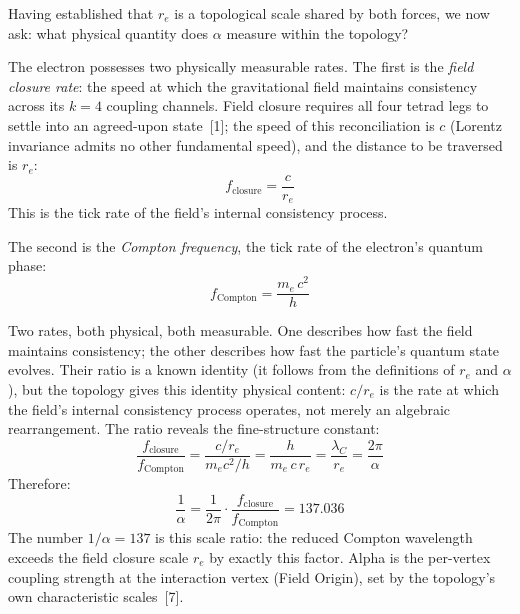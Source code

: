 \documentclass[11pt]{article}
\begin{document}
Having established that $r_e$ is a topological scale shared by both forces, we now ask: what physical quantity does $\alpha$ measure within the topology?

The electron possesses two physically measurable rates.
The first is the \emph{field closure rate}: the speed at which the gravitational field maintains consistency across its $k = 4$ coupling channels.
Field closure requires all four tetrad legs to settle into an agreed-upon state~[1]; the speed of this reconciliation is $c$ (Lorentz invariance admits no other fundamental speed), and the distance to be traversed is $r_e$:
\begin{equation}
f_{\text{closure}} = \frac{c}{r_e}
\label{eq:fclosure}
\end{equation}
This is the tick rate of the field's internal consistency process.

The second is the \emph{Compton frequency}, the tick rate of the electron's quantum phase:
\begin{equation}
f_{\text{Compton}} = \frac{m_e\,c^2}{h}
\label{eq:fcompton}
\end{equation}

Two rates, both physical, both measurable.
One describes how fast the field maintains consistency; the other describes how fast the particle's quantum state evolves.
Their ratio is a known identity (it follows from the definitions of $r_e$ and $\alpha$), but the topology gives this identity physical content: $c/r_e$ is the rate at which the field's internal consistency process operates, not merely an algebraic rearrangement.
The ratio reveals the fine-structure constant:
\begin{equation}
\frac{f_{\text{closure}}}{f_{\text{Compton}}} = \frac{c/r_e}{m_e c^2/h} = \frac{h}{m_e\,c\,r_e} = \frac{\lambda_C}{r_e} = \frac{2\pi}{\alpha}
\label{eq:alpha-from-rates}
\end{equation}
Therefore:
\begin{equation}
\frac{1}{\alpha} = \frac{1}{2\pi} \cdot \frac{f_{\text{closure}}}{f_{\text{Compton}}} = 137.036
\label{eq:alpha-value}
\end{equation}
The number $1/\alpha = 137$ is this scale ratio: the reduced Compton wavelength exceeds the field closure scale $r_e$ by exactly this factor.
Alpha is the per-vertex coupling strength at the interaction vertex (Field Origin), set by the topology's own characteristic scales~[7].
\end{document}
